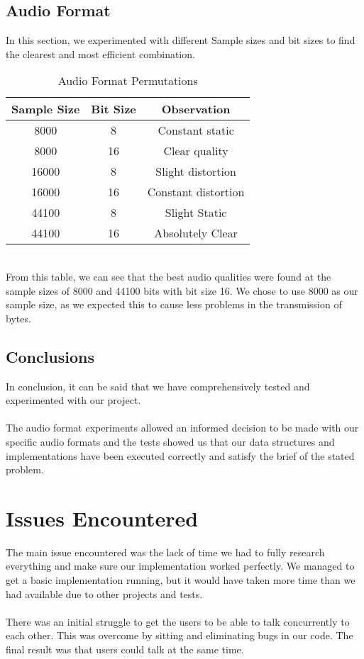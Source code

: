 \documentclass[13pt]{article}
\begin{document}
\subsection{Audio Format}
In this section, we experimented with different Sample sizes and bit sizes to find the clearest and most efficient combination.
\begin{table}[h!]
    \centering
    \begin{tabular}{|c|c|c|}
    \hline Sample Size & Bit Size & Observation \\
    \hline 8000 & 8 & Constant static \\
    \hline 8000 & 16 & Clear quality \\
    \hline 16000 & 8 & Slight distortion \\
    \hline 16000 & 16 & Constant distortion \\
    \hline 44100 & 8 & Slight Static \\
    \hline 44100 & 16 &  Absolutely Clear\\
    \hline
    \end{tabular}
    \caption{Audio Format Permutations}
    \label{tab:my_label}
\end{table}
\\
From this table, we can see that the best audio qualities were found at the sample sizes of 8000 and 44100 bits with bit size 16. We chose to use 8000 as our sample size, as we expected this to cause less problems in the transmission of bytes.

\subsection{Conclusions}

In conclusion, it can be said that we have comprehensively tested and experimented with our project.
\\\\
The audio format experiments allowed an informed decision to be made with our specific audio formats and the tests showed us that our data structures and implementations have been executed correctly and satisfy the brief of the stated problem.

\section{Issues Encountered}

The main issue encountered was the lack of time we had to fully research everything and make sure our implementation worked perfectly. We managed to get a basic implementation running, but it would have taken more time than we had available due to other projects and tests.
\\\\
There was an initial struggle to get the users to be able to talk concurrently to each other. This was overcome by sitting and eliminating bugs in our code. The final result was that users could talk at the same time.
\end{document}
